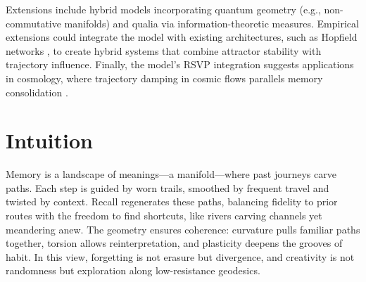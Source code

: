 \documentclass[a4paper,12pt]{article}
\begin{document}
Extensions include hybrid models incorporating quantum geometry (e.g., non-commutative 
manifolds) and qualia via information-theoretic measures. Empirical extensions could 
integrate the model with existing architectures, such as Hopfield networks \citep{hopfield1982neural}, 
to create hybrid systems that combine attractor stability with trajectory influence. 
Finally, the model’s RSVP integration suggests applications in cosmology, where trajectory 
damping in cosmic flows parallels memory consolidation \citep{weinberg2008cosmology}.

\section{Intuition}
Memory is a landscape of meanings—a manifold—where past journeys carve paths. Each step is guided by worn trails, smoothed by frequent travel and twisted by context. Recall regenerates these paths, balancing fidelity to prior routes with the freedom to find shortcuts, like rivers carving channels yet meandering anew. The geometry ensures coherence: curvature pulls familiar paths together, torsion allows reinterpretation, and plasticity deepens the grooves of habit. In this view, forgetting is not erasure but divergence, and creativity is not randomness but exploration along low-resistance geodesics.



\end{document}
